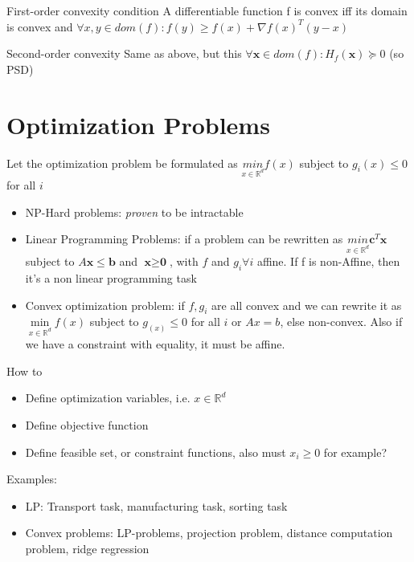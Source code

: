 \documentclass[a4paper]{article}
\begin{document}
\begin{mainbox}{First-order convexity condition}
    A differentiable function f is convex iff its domain is convex and $\forall x,y\in dom(f): f(y) \geq f(x) + \nabla f(x)^T (y-x)$ 
\end{mainbox}
\begin{subbox}{Second-order convexity}
    Same as above, but this $\forall \mathbf{x}\in dom(f) : H_f(\mathbf{x}) \succeq 0$ (so PSD)  
\end{subbox}


\section{Optimization Problems}
Let the optimization problem be formulated as $\underset{x\in\mathbb{R}^d}{min}f(x)$ subject to $g_i(x) \leq 0$ for all $i$   
\begin{itemize}
    \item NP-Hard problems: \textit{proven}  to be intractable
    \item  Linear Programming Problems: if a problem can be rewritten as $\underset{x\in\mathbb{R}^d}{min} \textbf{c} ^T\textbf{x} $ subject to $A\textbf{x}  \leq \textbf{b} $ and $\textbf{x} \geq\textbf{0} $, with $f$ and $g_i \forall i$ affine.   If f is non-Affine, then it's a non linear programming task
    \item Convex optimization problem: if $f, g_i$ are all convex and we can rewrite it as $\underset{x\in\mathbb{R}^d}{\min}f(x) $ subject to $g_(x) \leq 0$ for all $i$ or $Ax=b$, else non-convex. Also if we have a constraint with equality, it must be affine.
\end{itemize}

\begin{mainbox}{How to}
    \begin{itemize}
        \item Define optimization variables, i.e. $x\in\mathbb{R}^d$
        \item Define objective function 
        \item Define feasible set, or constraint functions, also must $x_i \geq 0$ for example? 
    \end{itemize}
    
\end{mainbox}

Examples:
\begin{itemize}
    \item LP: Transport task, manufacturing task, sorting task
    \item Convex problems: LP-problems, projection problem, distance computation problem, ridge regression
\end{itemize}
\end{document}
